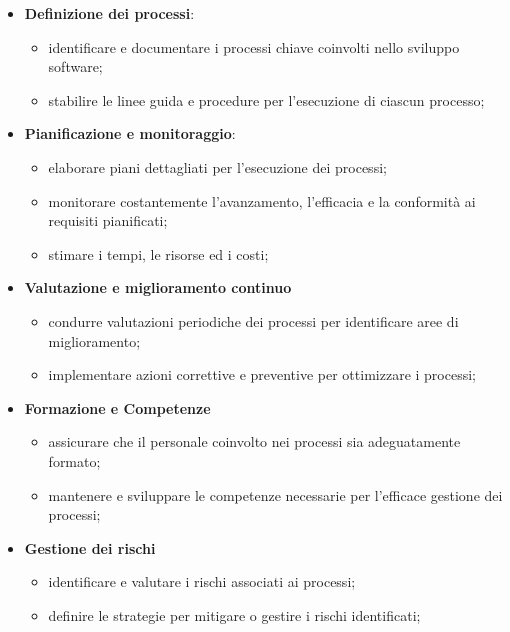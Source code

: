 \begin{itemize}
	\item \textbf{Definizione dei processi}:
	      \begin{itemize}
		      \item identificare e documentare i processi chiave coinvolti nello sviluppo software;
		      \item stabilire le linee guida e procedure per l'esecuzione di ciascun processo;
	      \end{itemize}
	\item \textbf{Pianificazione e monitoraggio}:
	      \begin{itemize}
		      \item elaborare piani dettagliati per l'esecuzione dei processi;
		      \item monitorare costantemente l'avanzamento, l'efficacia e la conformità ai requisiti pianificati;
		      \item stimare i tempi, le risorse ed i costi;
	      \end{itemize}
	\item \textbf{Valutazione e miglioramento continuo}
	      \begin{itemize}
		      \item condurre valutazioni periodiche dei processi per identificare aree di miglioramento;
		      \item implementare azioni correttive e preventive per ottimizzare i processi;
	      \end{itemize}
	\item \textbf{Formazione e Competenze}
	      \begin{itemize}
		      \item assicurare che il personale coinvolto nei processi sia adeguatamente formato;
		      \item mantenere e sviluppare le competenze necessarie per l'efficace gestione dei processi;
	      \end{itemize}
	\item \textbf{Gestione dei rischi}
	      \begin{itemize}
		      \item identificare e valutare i rischi associati ai processi;
		      \item definire le strategie per mitigare o gestire i rischi identificati;
	      \end{itemize}
\end{itemize}

